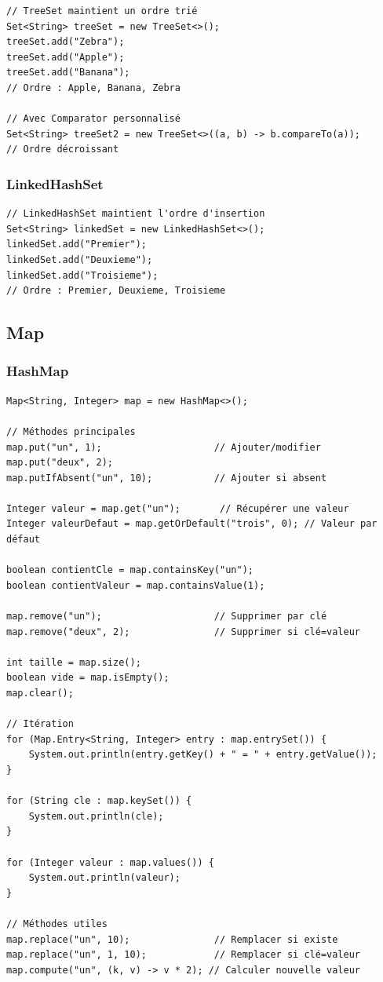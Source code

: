 \documentclass[11pt,a4paper]{article}
\begin{document}
\begin{lstlisting}
// TreeSet maintient un ordre trié
Set<String> treeSet = new TreeSet<>();
treeSet.add("Zebra");
treeSet.add("Apple");
treeSet.add("Banana");
// Ordre : Apple, Banana, Zebra

// Avec Comparator personnalisé
Set<String> treeSet2 = new TreeSet<>((a, b) -> b.compareTo(a));
// Ordre décroissant
\end{lstlisting}

\subsubsection{LinkedHashSet}

\begin{lstlisting}
// LinkedHashSet maintient l'ordre d'insertion
Set<String> linkedSet = new LinkedHashSet<>();
linkedSet.add("Premier");
linkedSet.add("Deuxieme");
linkedSet.add("Troisieme");
// Ordre : Premier, Deuxieme, Troisieme
\end{lstlisting}

\subsection{Map}

\subsubsection{HashMap}

\begin{lstlisting}
Map<String, Integer> map = new HashMap<>();

// Méthodes principales
map.put("un", 1);                    // Ajouter/modifier
map.put("deux", 2);
map.putIfAbsent("un", 10);           // Ajouter si absent

Integer valeur = map.get("un");       // Récupérer une valeur
Integer valeurDefaut = map.getOrDefault("trois", 0); // Valeur par défaut

boolean contientCle = map.containsKey("un");
boolean contientValeur = map.containsValue(1);

map.remove("un");                    // Supprimer par clé
map.remove("deux", 2);               // Supprimer si clé=valeur

int taille = map.size();
boolean vide = map.isEmpty();
map.clear();

// Itération
for (Map.Entry<String, Integer> entry : map.entrySet()) {
    System.out.println(entry.getKey() + " = " + entry.getValue());
}

for (String cle : map.keySet()) {
    System.out.println(cle);
}

for (Integer valeur : map.values()) {
    System.out.println(valeur);
}

// Méthodes utiles
map.replace("un", 10);               // Remplacer si existe
map.replace("un", 1, 10);            // Remplacer si clé=valeur
map.compute("un", (k, v) -> v * 2); // Calculer nouvelle valeur
\end{lstlisting}
\end{document}
